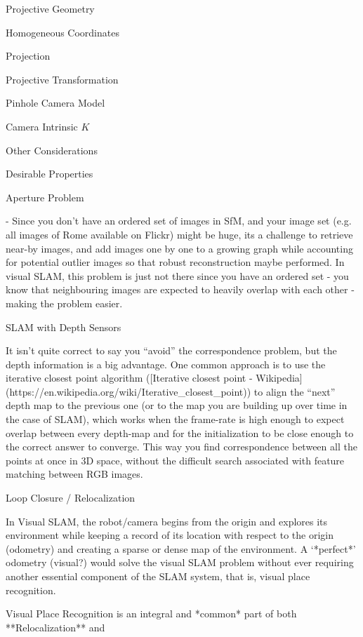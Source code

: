 \begin{section}
\begin{subsubsection}
\begin{subsubsection}
\begin{subsubsection}
\begin{section}{Projective Geometry}
\begin{subsection}{Homogeneous Coordinates}
\begin{subsubsection}
{\begin{subsubsection}{Projection}
\begin{subsubsection}{Projective Transformation}
\begin{subsection}
\begin{subsubsection}
\begin{subsubsection}
\begin{subsubsection}
{\begin{subsubsection}
\begin{subsection}
\begin{subsection} {Pinhole Camera Model}
\begin{subsection} {Camera Intrinsic $K$}
\begin{subsection}
\begin{subsection}
\begin{subsubsection}{Other Considerations}
{\begin{subsection}
\begin{subsubsection}{Desirable Properties}
\begin{section}
\begin{subsection}
\begin{subsection}
\begin{subsection}
\begin{section}
\begin{subsection}
\begin{subsubsection}
\begin{subsubsection}
\begin{subsection}
\begin{section}
\begin{subsection}
\begin{subsubsection}{Aperture Problem}
\begin{subsubsection}
{\begin{section}
\begin{subsubsection}
\begin{subsubsection}
\begin{subsubsection}
\begin{subsection}
\begin{subsection}
\begin{subsection}
\begin{subsection}
\begin{subsection}
\begin{subsection}
\begin{subsection}
\begin{subsubsection}
{- Since you don’t have an ordered set of images in SfM, and your image set (e.g. all images of Rome available on Flickr) might be huge, its a challenge to retrieve near-by images, and add images one by one to a growing graph while accounting for potential outlier images so that robust reconstruction maybe performed. In visual SLAM, this problem is just not there since you have an ordered set - you know that neighbouring images are expected to heavily overlap with each other - making the problem easier.

\begin{subsubsection}{ SLAM with Depth Sensors

It isn’t quite correct to say you “avoid” the correspondence problem, but the depth information is a big advantage. One common approach is to use the iterative closest point algorithm ([Iterative closest point - Wikipedia](https://en.wikipedia.org/wiki/Iterative_closest_point)) to align the “next” depth map to the previous one (or to the map you are building up over time in the case of SLAM), which works when the frame-rate is high enough to expect overlap between every depth-map and for the initialization to be close enough to the correct answer to converge. This way you find correspondence between all the points at once in 3D space, without the difficult search associated with feature matching between RGB images.



\begin{subsubsection} Loop Closure / Relocalization

In Visual SLAM, the robot/camera begins from the origin and explores its environment while keeping a record of its location with respect to the origin (odometry) and creating a sparse or dense map of the environment. A ‘*perfect*’ odometry (visual?) would solve the visual SLAM problem without ever requiring another essential component of the SLAM system, that is, visual place recognition.

Visual Place Recognition is an integral and *common* part of both **Relocalization** and 
\end{subsubsection}}
\end{subsubsection}}
\end{subsubsection}
\end{subsection}
\end{subsection}
\end{subsection}
\end{subsection}
\end{subsection}
\end{subsection}
\end{subsection}
\end{subsubsection}
\end{subsubsection}
\end{subsubsection}
\end{section}}
\end{subsubsection}
\end{subsubsection}
\end{subsection}
\end{section}
\end{subsection}
\end{subsubsection}
\end{subsubsection}
\end{subsection}
\end{section}
\end{subsection}
\end{subsection}
\end{subsection}
\end{section}
\end{subsubsection}
\end{subsection}}
\end{subsubsection}
\end{subsection}
\end{subsection}
\end{subsection}
\end{subsection}
\end{subsection}
\end{subsubsection}}
\end{subsubsection}
\end{subsubsection}
\end{subsubsection}
\end{subsection}
\end{subsubsection}
\end{subsubsection}}
\end{subsubsection}
\end{subsection}
\end{section}
\end{subsubsection}
\end{subsubsection}
\end{subsubsection}
\end{section}
